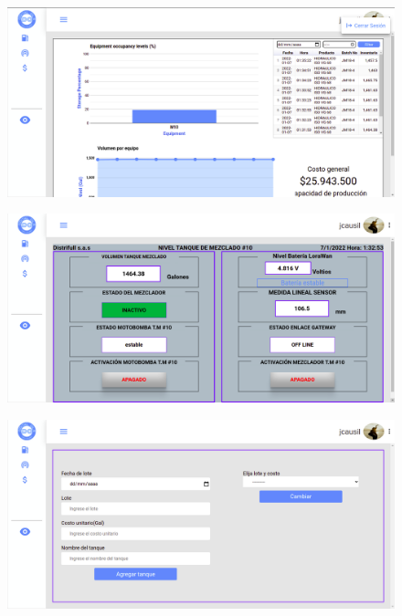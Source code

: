 \begin{figure}[!]
	\centering
	\includegraphics[width=1\linewidth, height=0.4\textheight]{imagenes/dashboardExit}
	\caption[Primera parte del inicio.]{}
	\label{fig:exitDashboard}
\end{figure}

\begin{figure}[!]
	\centering
	\includegraphics[width=1\linewidth, height=0.4\textheight]{imagenes/dashboardSensores}
	\caption[Primera parte del inicio.]{}
	\label{fig:dashboardSensores}
\end{figure}

\begin{figure}[!]
	\centering
	\includegraphics[width=1\linewidth, height=0.4\textheight]{imagenes/dashboardEstadistica}
	\caption[Primera parte del inicio.]{}
	\label{fig:dashboardEstadistica}
\end{figure}